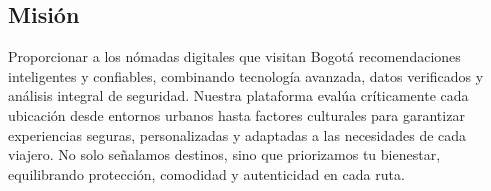 \subsection{Misión}

Proporcionar a los nómadas digitales que visitan Bogotá recomendaciones inteligentes y confiables, combinando tecnología avanzada, datos verificados y análisis integral de seguridad. Nuestra plataforma evalúa críticamente cada ubicación desde entornos urbanos hasta factores culturales para garantizar experiencias seguras, personalizadas y adaptadas a las necesidades de cada viajero. No solo señalamos destinos, sino que priorizamos tu bienestar, equilibrando protección, comodidad y autenticidad en cada ruta.
